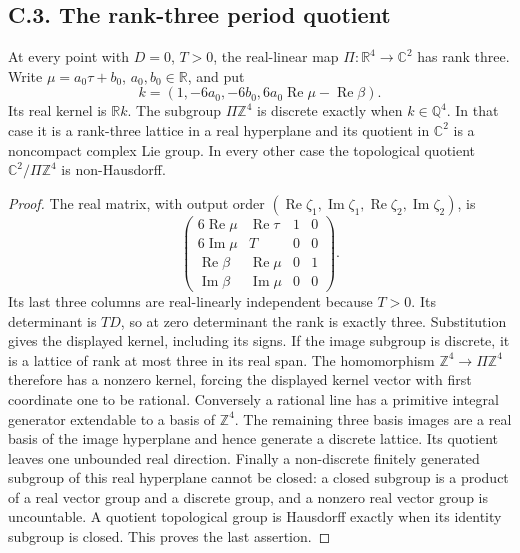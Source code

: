 \subsection{C.3. The rank-three period quotient}
\begin{proposition}[C.3.1; Proved]\label{st:C.3.1}
At every point with \(D=0\), \(T>0\), the real-linear map
\(\Pi:\mathbb R^4\to\mathbb C^2\) has rank three. Write
\(\mu=a_0\tau+b_0\), \(a_0,b_0\in\mathbb R\), and put
\[
 k=(1,-6a_0,-6b_0,6a_0\operatorname{Re}\mu-\operatorname{Re}\beta).
\]
Its real kernel is \(\mathbb R k\). The subgroup \(\Pi\mathbb Z^4\) is
discrete exactly when \(k\in\mathbb Q^4\). In that case it is a
rank-three lattice in a real hyperplane and its quotient in \(\mathbb C^2\)
is a noncompact complex Lie group. In every other case the topological
quotient \(\mathbb C^2/\Pi\mathbb Z^4\) is non-Hausdorff.
\end{proposition}
\begin{proof}
The real matrix, with output order
\((\operatorname{Re}\zeta_1,\operatorname{Im}\zeta_1,
\operatorname{Re}\zeta_2,\operatorname{Im}\zeta_2)\), is
\[
 \begin{pmatrix}6\operatorname{Re}\mu&\operatorname{Re}\tau&1&0\\
 6\operatorname{Im}\mu&T&0&0\\
 \operatorname{Re}\beta&\operatorname{Re}\mu&0&1\\
 \operatorname{Im}\beta&\operatorname{Im}\mu&0&0\end{pmatrix}.
\]
Its last three columns are real-linearly independent because \(T>0\).
Its determinant is \(TD\), so at zero determinant the rank is exactly
three. Substitution gives the displayed kernel, including its signs.
If the image subgroup is discrete, it is a lattice of rank at most three
in its real span. The homomorphism \(\mathbb Z^4\to\Pi\mathbb Z^4\)
therefore has a nonzero kernel, forcing the displayed kernel vector with
first coordinate one to be rational. Conversely a rational line has a
primitive integral generator extendable to a basis of \(\mathbb Z^4\).
The remaining three basis images are a real basis of the image hyperplane
and hence generate a discrete lattice. Its quotient leaves one unbounded
real direction. Finally a non-discrete finitely generated subgroup of
this real hyperplane cannot be closed: a closed subgroup is a product of
a real vector group and a discrete group, and a nonzero real vector group
is uncountable. A quotient topological group is Hausdorff exactly when its
identity subgroup is closed. This proves the last assertion.
\end{proof}


